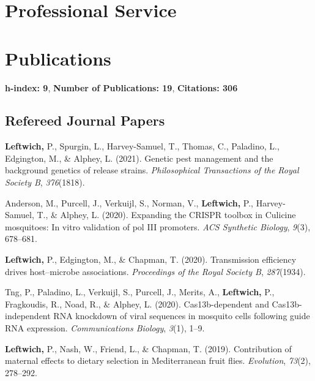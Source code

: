 \documentclass[11pt, a4paper]{awesome-cv}
\begin{document}
\hypertarget{professional-service}{%
\section{Professional Service}\label{professional-service}}

\newpage

\hypertarget{publications}{%
\section{Publications}\label{publications}}

\textbf{h-index: 9}, \textbf{Number of Publications: 19},
\textbf{Citations: 306}

\hypertarget{refereed-journal-papers}{%
\subsection{Refereed Journal Papers}\label{refereed-journal-papers}}

\hypertarget{refs_journals}{}
\leavevmode\hypertarget{ref-13}{}%
\textbf{Leftwich,} P., Spurgin, L., Harvey-Samuel, T., Thomas, C.,
Paladino, L., Edgington, M., \& Alphey, L. (2021). Genetic pest
management and the background genetics of release strains.
\emph{Philosophical Transactions of the Royal Society B},
\emph{376}(1818).

\leavevmode\hypertarget{ref-11}{}%
Anderson, M., Purcell, J., Verkuijl, S., Norman, V., \textbf{Leftwich,}
P., Harvey-Samuel, T., \& Alphey, L. (2020). Expanding the CRISPR
toolbox in {Culicine} mosquitoes: In vitro validation of pol III
promoters. \emph{ACS Synthetic Biology}, \emph{9}(3), 678--681.

\leavevmode\hypertarget{ref-14}{}%
\textbf{Leftwich,} P., Edgington, M., \& Chapman, T. (2020).
Transmission efficiency drives host--microbe associations.
\emph{Proceedings of the Royal Society B}, \emph{287}(1934).

\leavevmode\hypertarget{ref-16}{}%
Tng, P., Paladino, L., Verkuijl, S., Purcell, J., Merits, A.,
\textbf{Leftwich,} P., Fragkoudis, R., Noad, R., \& Alphey, L. (2020).
Cas13b-dependent and {Cas}13b-independent {RNA} knockdown of viral
sequences in mosquito cells following guide {RNA} expression.
\emph{Communications Biology}, \emph{3}(1), 1--9.

\leavevmode\hypertarget{ref-15}{}%
\textbf{Leftwich,} P., Nash, W., Friend, L., \& Chapman, T. (2019).
Contribution of maternal effects to dietary selection in {Mediterranean}
fruit flies. \emph{Evolution}, \emph{73}(2), 278--292.
\end{document}
